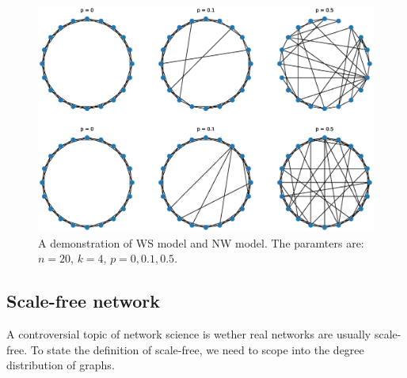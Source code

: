\documentclass[12pt]{article}
\begin{document}
\begin{figure}[ht]
    \includegraphics[width = \textwidth]{small_world_network_model.eps}
    \centering
    \caption{A demonstration of WS model and NW model. The paramters are: $n=20$, $k=4$, $p=0,0.1,0.5$.}
    \label{fig:small_world_models}
\end{figure}

\subsection{Scale-free network}
A controversial topic of network science is wether real networks are usually scale-free. To state the definition of scale-free, we need to scope into the degree distribution of graphs.\\
\end{document}
